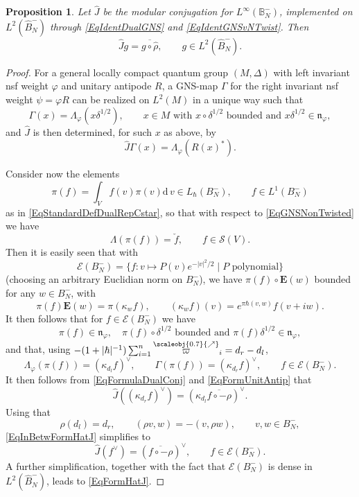 \documentclass[11pt, reqno]{amsart}
\newtheorem{prop}[theorem]{Proposition}
\theoremstyle{definition}
\numberwithin{equation}{section}
\def\Sc{\mathcal S}
\newcommand{\rd}{\mathrm{d}\!\,}
\newcommand{\Bor}{B}
\newcommand{\nears}{\scaleobj{0.7}{\nearrow}}
\newcommand{\nevarpi}{\overset{\nears}{\varpi}}
\newcommand{\Eb}{\mathbf{E}}
\newcommand{\mfn}{\mathfrak{n}}
\newcommand{\Ec}{\mathcal{E}}
\newcommand{\Bbbb}{\mathbb{B}}
\begin{document}
\begin{prop}
Let $\hat{J}$ be the modular conjugation for $L^{\infty}(\Bbbb_N^-)$, implemented on $L^2(\hat{B}_N^-)$ through \eqref{EqIdentDualGNS} and \eqref{EqIdentGNSvNTwist}.  Then
\begin{equation}\label{EqFormHatJ}
\hat{J}g = \overline{g\circ \hat{\rho}},\qquad g\in L^2(\hat{\Bor}_N^-).
\end{equation}
\end{prop}
\begin{proof}
For a general locally compact quantum group $(M,\Delta)$ with left invariant nsf weight $\varphi$ and unitary antipode $R$, a GNS-map $\Gamma$ for the right invariant nsf weight $\psi = \varphi R$ can be realized on $L^2(M)$ in a unique way such that 
\[
\Gamma(x) = \Lambda_{\varphi}(x\delta^{1/2}),\qquad x\in M\textrm{ with } x\circ \delta^{1/2} \textrm{ bounded and }x\delta^{1/2} \in \mfn_{\varphi}, 
\]
and $\hat{J}$ is then determined, for such $x$ as above, by 
\begin{equation}\label{EqFormulaDualConj}
\hat{J}\Gamma(x) = \Lambda_{\varphi}(R(x)^*).
\end{equation}

Consider now the elements 
\[
\pi(f) = \int_V f(v) \pi(v) \rd v \in L_{\hbar}(\Bor_N^-), \qquad f\in L^1(\Bor_N^-)
\]
as in \eqref{EqStandardDefDualRepCstar}, so that with respect to \eqref{EqGNSNonTwisted} we have
\[
\Lambda(\pi(f)) = \check{f},\qquad f \in \Sc(V). 
\]
Then it is easily seen that with 
\[
\Ec(\Bor_N^-) = \{f\colon  v\mapsto P(v)e^{-|v|^2/2}\mid P\textrm{ polynomial}\}
\]
(choosing an arbitrary Euclidian norm on $\Bor_N^-$), we have $\pi(f)\circ \Eb(w)$ bounded for any $w\in \Bor_N^-$, with 
\[
\pi(f)\Eb(w) = \pi(\kappa_wf),\qquad (\kappa_wf)(v) = e^{\pi \hbar (v,w)}f(v+iw).
\]
It then follows that for $f\in \Ec(\Bor_N^-)$ we have 
\[
\pi(f) \in \mfn_{\varphi},\quad \pi(f)\circ \delta^{1/2}\textrm{ bounded and }\pi(f)\delta^{1/2} \in \mfn_{\varphi},
\]
and that, using $-(1+|\hbar|^{-1})\sum_{i=1}^n \nevarpi_i = d_r-d_l$, 
\[
\Lambda_{\varphi}(\pi(f)) = (\kappa_{d_l}f)^{\vee},\qquad \Gamma(\pi(f)) = (\kappa_{d_r}f)^{\vee},\qquad f \in \Ec(\Bor_N^-).
\]
It then follows from \eqref{EqFormulaDualConj} and \eqref{EqFormUnitAntip} that 
\begin{equation}\label{EqInBetwFormHatJ}
\hat{J}((\kappa_{d_r}f)^{\vee}) = (\kappa_{d_l} \overline{f\circ -\rho})^{\vee}.
\end{equation}
Using that 
\[
\rho(d_l)  = d_r,\qquad (\rho v,w) = -(v,\rho w),\qquad v,w\in \Bor_N^-,
\]
\eqref{EqInBetwFormHatJ} simplifies to 
\[
\hat{J}(f^{\vee}) = (\overline{f\circ -\rho})^{\vee},\qquad f\in \Ec(\Bor_N^-). 
\]
A further simplification, together with the fact that $\Ec(\Bor_N^-)$ is dense in $L^2(\hat{\Bor}_N^-)$, leads to \eqref{EqFormHatJ}.
\end{proof}
\end{document}
